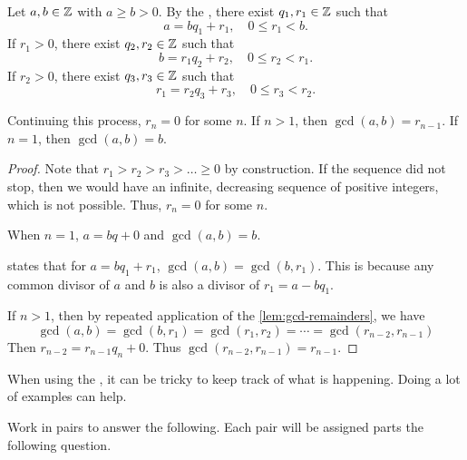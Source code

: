 \documentclass{ximera}
\begin{document}
\begin{theorem}\label{euclid-alg}
	Let $a,b\in\mathbb Z$ with $a\geq b>0$. By the , there exist $q_1,r_1\in\mathbb Z$ such that 
	\[a=b q_1+r_1,\quad 0\leq r_1<b.\]
	If $r_1>0$, there exist $q_2,r_2\in\mathbb Z$ such that 
	\[b=r_1 q_2+r_2,\quad 0\leq r_2<r_1.\]
	If $r_2>0$, there exist $q_3,r_3\in\mathbb Z$ such that 
	\[r_1=r_2 q_3+r_3,\quad 0\leq r_3<r_2.\]
	
	Continuing this process, $r_n=0$ for some $n$. If $n>1$, then $\gcd(a,b)=r_{n-1}$. If $n=1$, then $\gcd(a,b)=b$.
\begin{proof}
	 Note that $r_1>r_2>r_3>\dots\geq0$ by construction. If the sequence did not stop, then we would have an infinite, decreasing sequence of positive integers, which is not possible. Thus, $r_n=0$ for some $n$. 
	 
	 When $n=1$, $a=bq+0$ and $\gcd(a,b)=b$.
	 
	  states that for $a=bq_1+r_1$, $\gcd(a,b)=\gcd(b,r_1)$. This is because any common divisor of $a$ and $b$  is also a divisor of $r_1=a-bq_1$. 
	 
	 If $n>1$, then by repeated application of the \cref{lem:gcd-remainders}, we have 
	 \[\gcd(a,b)=\gcd(b,r_1)=\gcd(r_1,r_2)=\cdots=\gcd(r_{n-2},r_{n-1})\]
	 Then $r_{n-2}=r_{n-1} q_n+0$. Thus $\gcd(r_{n-2},r_{n-1})=r_{n-1}$.
\end{proof}
\end{theorem}

When using the , it can be tricky to keep track of what is happening. Doing a lot of examples can help.
	


Work in pairs to answer the following. Each pair will be assigned parts the following question.
\end{document}
